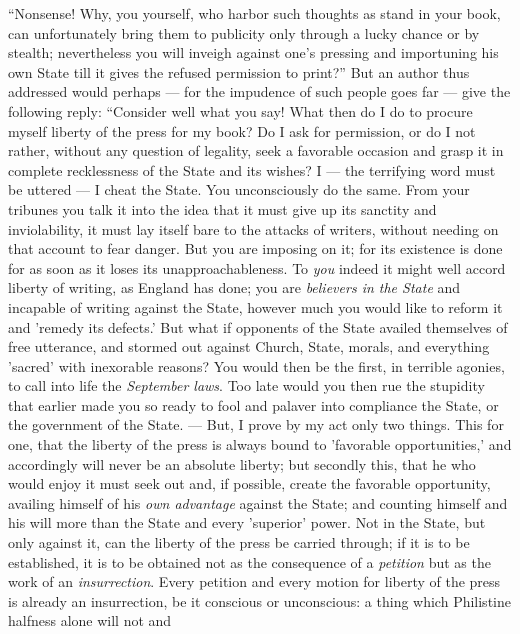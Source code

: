 ``Nonsense! Why, you yourself, who harbor such thoughts as stand in your 
book, can unfortunately bring them to publicity only through a lucky chance or 
by stealth; nevertheless you will inveigh against one's pressing and 
importuning his own State till it gives the refused permission to print?'' 
But an author thus addressed would perhaps --- for the impudence of such people 
goes far --- give the following reply: ``Consider well what you say! What then 
do I do to procure myself liberty of the press for my book? Do I ask for 
permission, or do I not rather, without any question of legality, seek a 
favorable occasion and grasp it in complete recklessness of the State and its 
wishes? I --- the terrifying word must be uttered --- I cheat the State. You 
unconsciously do the same. From your tribunes you talk it into the idea that 
it must give up its sanctity and inviolability, it must lay itself bare to the 
attacks of writers, without needing on that account to fear danger. But you 
are imposing on it; for its existence is done for as soon as it loses its 
unapproachableness. To \textit{you} indeed it might well accord liberty of 
writing, as England has done; you are \textit{believers in the State} and 
incapable of writing against the State, however much you would like to reform 
it and 'remedy its defects.' But what if opponents of the State availed 
themselves of free utterance, and stormed out against Church, State, morals, 
and everything 'sacred' with inexorable reasons? You would then be the first, 
in terrible agonies, to call into life the \textit{September laws}. Too late 
would you then rue the stupidity that earlier made you so ready to fool and 
palaver into compliance the State, or the government of the State. --- But, I 
prove by my act only two things. This for one, that the liberty of the press 
is always bound to 'favorable opportunities,' and accordingly will never be an 
absolute liberty; but secondly this, that he who would enjoy it must seek out 
and, if possible, create the favorable opportunity, availing himself of his 
\textit{own advantage} against the State; and counting himself and his will 
more than the State and every 'superior' power. Not in the State, but only 
against it, can the liberty of the press be carried through; if it is to be 
established, it is to be obtained not as the consequence of a 
\textit{petition} but as the work of an \textit{insurrection}. Every petition 
and every motion for liberty of the press is already an insurrection, be it 
conscious or unconscious: a thing which Philistine halfness alone will not and 
